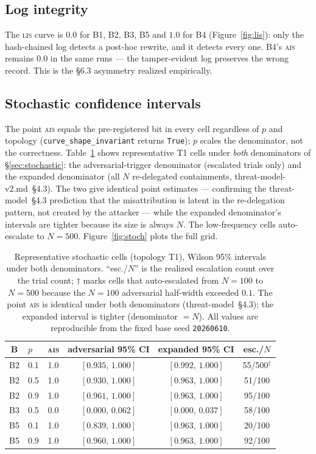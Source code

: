 \documentclass[11pt]{article}
\newcommand{\ais}{\textsc{ais}}
\newcommand{\lis}{\textsc{lis}}
\newcommand{\code}[1]{\texttt{#1}}
\begin{document}
\subsection{Log integrity}
The \lis{} curve is $0.0$ for B1, B2, B3, B5 and $\mathbf{1.0}$ for B4
(Figure~\ref{fig:lis}): only the hash-chained log detects a post-hoc rewrite,
and it detects every one. B4's \ais{} remains $0.0$ in the same runs --- the
tamper-evident log preserves the wrong record. This is the §6.3 asymmetry
realized empirically.

\subsection{Stochastic confidence intervals}
The point \ais{} equals the pre-registered bit in every cell regardless of
$p$ and topology (\code{curve\_shape\_invariant} returns \code{True}); $p$
scales the denominator, not the correctness. Table~\ref{tab:stoch} shows
representative T1 cells under \emph{both} denominators of \S\ref{sec:stochastic}:
the adversarial-trigger denominator (escalated trials only) and the expanded
denominator (all $N$ re-delegated containments, threat-model-v2.md~\S4.3). The
two give identical point estimates --- confirming the threat-model~\S4.3
prediction that the misattribution is
latent in the re-delegation pattern, not created by the attacker --- while the
expanded denominator's intervals are tighter because its size is always $N$.
The low-frequency cells auto-escalate to $N=500$. Figure~\ref{fig:stoch} plots
the full grid.

\begin{table}[h]
\centering
\caption{Representative stochastic cells (topology T1), Wilson 95\% intervals
under both denominators. ``esc./$N$'' is the realized escalation count over the
trial count; $\dagger$ marks cells that auto-escalated from $N=100$ to $N=500$
because the $N=100$ adversarial half-width exceeded $0.1$. The point \ais{} is
identical under both denominators (threat-model~\S4.3); the expanded interval is tighter
(denominator $=N$). All values are reproducible from the fixed base seed
\code{20260610}.}
\label{tab:stoch}
\begin{tabular}{clcccc}
\toprule
\textbf{B} & \textbf{$p$} & \textbf{\ais{}} &
\textbf{adversarial 95\% CI} & \textbf{expanded 95\% CI} & \textbf{esc./$N$} \\
\midrule
B2 & 0.1 & 1.0 & $[0.935,\,1.000]$ & $[0.992,\,1.000]$ & 55/500$^\dagger$ \\
B2 & 0.5 & 1.0 & $[0.930,\,1.000]$ & $[0.963,\,1.000]$ & 51/100 \\
B2 & 0.9 & 1.0 & $[0.961,\,1.000]$ & $[0.963,\,1.000]$ & 95/100 \\
B3 & 0.5 & 0.0 & $[0.000,\,0.062]$ & $[0.000,\,0.037]$ & 58/100 \\
B5 & 0.1 & 1.0 & $[0.839,\,1.000]$ & $[0.963,\,1.000]$ & 20/100 \\
B5 & 0.9 & 1.0 & $[0.960,\,1.000]$ & $[0.963,\,1.000]$ & 92/100 \\
\bottomrule
\end{tabular}
\end{table}
\end{document}
